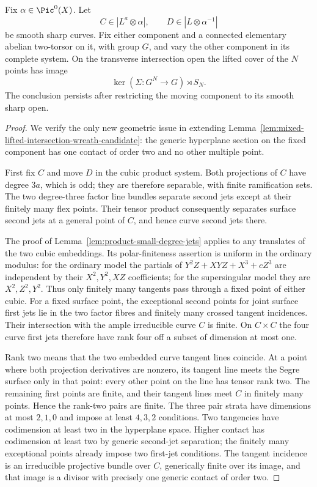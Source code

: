 \begin{lemma}
\label{lem:mixed-even-unequal-lifted-wreath-candidate}
Fix $\alpha\in\Pic^0(X)$. Let
\[
 C\in|L^a\otimes\alpha|,\qquad
 D\in|L\otimes\alpha^{-1}|
\]
be smooth sharp curves. Fix either component and a connected
elementary abelian two-torsor on it, with group $G$, and vary
the other component in its complete system. On the transverse
intersection open the lifted cover of the $N$ points has image
\[
                     \ker(\Sigma:G^N\to G)\rtimes S_N.
\]
The conclusion persists after restricting the moving component
to its smooth sharp open.
\end{lemma}
\begin{proof}
We verify the only new geometric issue in extending
Lemma~\ref{lem:mixed-lifted-intersection-wreath-candidate}:
the generic hyperplane section on the fixed component has
one contact of order two and no other multiple point.

First fix $C$ and move $D$ in the cubic product system.
Both projections of $C$ have degree $3a$, which is odd;
they are therefore separable, with finite ramification sets.
The two degree-three factor line bundles separate second
jets except at their finitely many flex points. Their tensor
product consequently separates surface second jets at a
general point of $C$, and hence curve second jets there.

The proof of Lemma~\ref{lem:product-small-degree-jets} applies
to any translates of the two cubic embeddings. Its
polar-finiteness assertion is uniform in the ordinary modulus:
for the ordinary model the partials of
$Y^2Z+XYZ+X^3+cZ^3$ are independent by their $X^2,Y^2,XZ$
coefficients; for the supersingular model they are
$X^2,Z^2,Y^2$. Thus only finitely many tangents pass through
a fixed point of either cubic. For a fixed surface point,
the exceptional second points for joint surface first jets
lie in the two factor fibres and finitely many crossed
tangent incidences. Their intersection with the ample
irreducible curve $C$ is finite. On $C\times C$ the four
curve first jets therefore have rank four off a subset of
dimension at most one.

Rank two means that the two embedded curve tangent lines
coincide. At a point where both projection derivatives are
nonzero, its tangent line meets the Segre surface only in
that point: every other point on the line has tensor rank
two. The remaining first points are finite, and their
tangent lines meet $C$ in finitely many points. Hence the
rank-two pairs are finite. The three pair strata have
dimensions at most $2,1,0$ and impose at least $4,3,2$
conditions. Two tangencies have codimension at least two
in the hyperplane space. Higher contact has codimension
at least two by generic second-jet separation; the finitely
many exceptional points already impose two first-jet
conditions. The tangent incidence is an irreducible
projective bundle over $C$, generically finite over its
image, and that image is a divisor with precisely one
generic contact of order two.


\end{proof}
